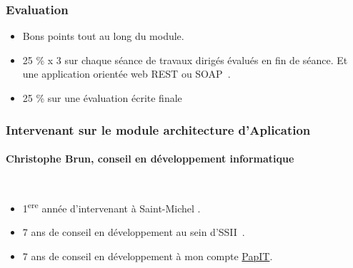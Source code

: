 \documentclass{beamer}
\begin{document}
    \begin{frame}
        \transdissolve
        \frametitle{Evaluation}
        \begin{itemize}
            \item Bons points tout au long du module.
            \item 25 \% x 3 sur chaque séance de travaux dirigés évalués en fin de séance.
            Et une application orientée web REST ou SOAP~.
            \item 25 \% sur une évaluation écrite finale
        \end{itemize}
    \end{frame}

    \begin{frame}
        \transdissolve
        \frametitle{Intervenant sur le module architecture d'Aplication}
        \framesubtitle{Christophe Brun, conseil en développement informatique}

        \begin{columns}
            \begin{itemize}
                \item 1\textsuperscript{ere} année d'intervenant à Saint-Michel .

                \item 7 ans de conseil en développement au sein d'SSII~.

                \item 7 ans de conseil en développement à mon compte \href{https://papit.fr}{PapIT}.


\end{itemize}
\end{columns}
\end{frame}
\end{document}

